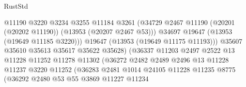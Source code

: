 \begin{lexlean}{RustStd}
\begin{coremodule}
                                          @11190
                                          @3220
                                          @3234
                                          @3255
                                          @11184
                                          @3261
                                          (@34729
                                            @2467
                                            @11190
                                            (@20201 (@20202 @11190))
                                            (@13953 (@20207 @2467 @53)))
                                          @34697
                                          @19647
                                          (@13953 (@19649 @11185 @3220)))
                                        @19647
                                        (@13953 (@19649 @11175 @11193)))
                                      @35607
                                      @35610
                                      @35613
                                      @35617
                                      @35622
                                      @35628)
                                    (@36337
                                      @11203
                                      @2497
                                      @2522
                                      @13
                                      @11228
                                      @11252
                                      @11278
                                      @11302
                                      (@36272
                                        @2482
                                        @2489
                                        @2496
                                        @13
                                        @11228
                                        @11237
                                        @3220
                                        @11252
                                        (@36283
                                          @2481
                                          @1014
                                          @24105
                                          @11228
                                          @11235
                                          @8775
                                          (@36292
                                            @2480
                                            @53
                                            @55
                                            @3869
                                            @11227
                                            @11234

\end{coremodule}
\end{lexlean}
